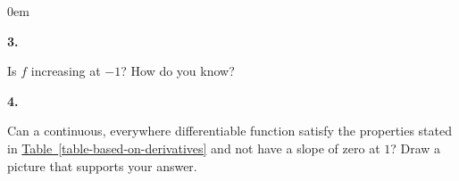\documentclass[12pt,]{book}
\theoremstyle{plain}
\theoremstyle{definition}
\newenvironment{exercisegroup}%
{\medskip\noindent}%
{\par\bigskip}%
\newlength{\exercisegroupindent}%
\newlength{\exercisegroupitemwidth}%
\newenvironment{exercisegrouplist}%
{\vspace{-\partopsep}%
\begin{adjustwidth}{\exercisegroupindent}{0em}}%
{\end{adjustwidth}%
\vspace{-\partopsep}%
\vspace{\baselineskip}}%
\newenvironment{exercisegroupbycol}[1]%
{\begin{exercisegrouplist}%
\vspace{-\multicolsep}%
\begin{multicols}{#1}%
\setlength{\parindent}{0em}%
\setlength{\exercisegroupitemwidth}{\linewidth}}%
{\end{multicols}%
\vspace{-\multicolsep}%
\end{exercisegrouplist}}%
\newenvironment{exercisegroupitem}[1]%
{\begin{minipage}[t]{\exercisegroupitemwidth}
\vspace{0pt}%
{\bfseries#1}%
\rule{0pt}{\baselineskip}}{\strut%
\end{minipage}%
\hspace{\columnsep}}%
\providecommand\phantomsection{}
\begin{document}
\begin{exercisegroup}
\begin{exercisegroupbycol}{1}
\par%
\begin{exercisegroupitem}{3. }\phantomsection\hypertarget{exercise-3}{\null}
Is \(f\) increasing at \(-1\)?  How do you know?%
\end{exercisegroupitem}%
\par%
\begin{exercisegroupitem}{4. }\phantomsection\hypertarget{exercise-4}{\null}
Can a continuous, everywhere differentiable function satisfy the properties stated in \hyperref[table-based-on-derivatives]{Table~\ref*{table-based-on-derivatives}} and not have a slope of zero at \(1\)?  Draw a picture that supports your answer.%
\end{exercisegroupitem}%
\par%
\end{exercisegroupbycol}%
\end{exercisegroup}%
\end{document}
